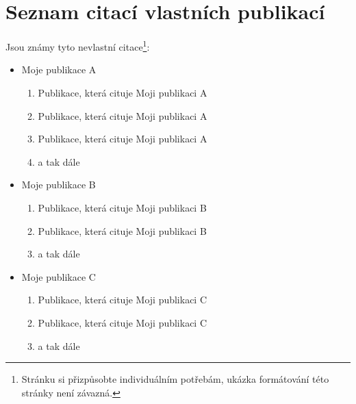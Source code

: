 \chapter*{Seznam citací vlastních publikací}
\label{sec:ListOfCitations}
Jsou známy tyto nevlastní citace\footnote{Stránku si přizpůsobte individuálním potřebám, ukázka formátování této stránky není závazná.}:
\begin{itemize}
	\item Moje publikace A
		\begin{enumerate}
			\item Publikace, která cituje Moji publikaci A
			\item Publikace, která cituje Moji publikaci A
			\item Publikace, která cituje Moji publikaci A
			\item a tak dále
		\end{enumerate}
	\item Moje publikace B
		\begin{enumerate}
			\item Publikace, která cituje Moji publikaci B
			\item Publikace, která cituje Moji publikaci B
			\item a tak dále
		\end{enumerate}
	\item Moje publikace C
		\begin{enumerate}
			\item Publikace, která cituje Moji publikaci C
			\item Publikace, která cituje Moji publikaci C
			\item a tak dále
		\end{enumerate}
\end{itemize}



